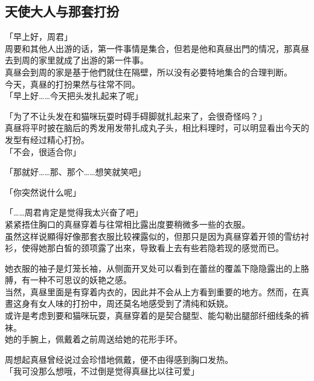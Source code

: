 \subsection{天使大人与那套打扮}

「早上好，周君」\\

周要和其他人出游的话，第一件事情是集合，但若是他和真昼出門的情况，那真昼去到周的家里就成了出游的第一件事。\\

真昼会到周的家是基于他們就住在隔壁，所以没有必要特地集合的合理判断。\\

今天，真昼的打扮果然与往常不同。\\

「早上好……今天把头发扎起来了呢」

「为了不让头发在和猫咪玩耍时碍手碍脚就扎起来了，会很奇怪吗？」\\

真昼将平时披在脑后的秀发用发带扎成丸子头，相比料理时，可以明显看出今天的发型有经过精心打扮。\\

「不会，很适合你」

「那就好……那、那个……想笑就笑吧」

「你突然说什么呢」

「……周君肯定是觉得我太兴奋了吧」\\

紧紧捂住胸口的真昼穿着与往常相比露出度要稍微多一些的衣服。\\

虽然这样说顯得好像那套衣服比较裸露似的，但那只是因为真昼穿着开领的雪纺衬衫，使得她那白皙的颈项露了出來，导致看上去有些若隐若现的感觉而已。

她衣服的袖子是灯笼长袖，从侧面开叉处可以看到在蕾丝的覆盖下隐隐露出的上胳膊，有一种不可思议的妖艳之感。\\

当然，真昼里面是有穿着内衣的，因此并不会从上方看到重要的地方。然而，在真晝这身有女人味的打扮中，周还莫名地感受到了清纯和妖娆。\\

或许是考虑到要和猫咪玩耍，真昼穿着的是契合腿型、能勾勒出腿部纤细线条的裤袜。\\

她的手腕上，佩戴着之前周送给她的花形手环。

周想起真昼曾经说过会珍惜地佩戴，便不由得感到胸口发热。\\

「我可没那么想哦，不过倒是觉得真昼比以往可爱」

